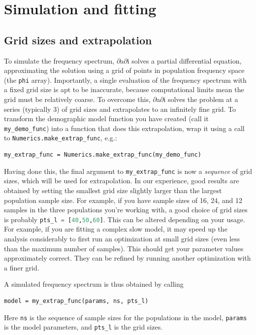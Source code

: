 \documentclass[12pt]{article}
\makeatletter
\newcommand{\dadi}{$\partial$a$\partial$i\xspace}
\newcommand{\py}[1]{\lstinline[language=Python, showstringspaces=False]@#1@}
\makeatother
\begin{document}
\clearpage

\section{Simulation and fitting}

\subsection{Grid sizes and extrapolation}

To simulate the frequency spectrum, \dadi solves a partial differential equation, approximating the solution using a grid of points in population frequency space (the \py{phi} array).
Importantly, a single evaluation of the frequency spectrum with a fixed grid size is apt to be inaccurate, because computational limits mean the grid must be relatively coarse.
To overcome this, \dadi solves the problem at a series (typically 3) of grid sizes and extrapolates to an infinitely fine grid.
To transform the demographic model function you have created (call it \py{my_demo_func}) into a function that does this extrapolation, wrap it using a call to \py{Numerics.make_extrap_func}, e.g.:
\begin{lstlisting}
my_extrap_func = Numerics.make_extrap_func(my_demo_func)
\end{lstlisting}
Having done this, the final argument to \py{my_extrap_func} is now a \emph{sequence} of grid sizes, which will be used for extrapolation.
In our experience, good results are obtained by setting the smallest grid size slightly larger than the largest population sample size.
For example, if you have sample sizes of 16, 24, and 12 samples in the three populations you're working with, a good choice of grid sizes is probably \py{pts_l = [40,50,60]}.
This can be altered depending on your usage. For example, if you are fitting a complex slow model, it may speed up the analysis considerably to first run an optimization at small grid sizes (even less than the maximum number of samples).
This should get your parameter values approximately correct.
They can be refined by running another optimization with a finer grid.

A simulated frequency spectrum is thus obtained by calling
\begin{lstlisting}
model = my_extrap_func(params, ns, pts_l)
\end{lstlisting}
Here \py{ns} is the sequence of sample sizes for the populations in the model, \py{params} is the model parameters, and \py{pts_l} is the grid sizes.
\end{document}
